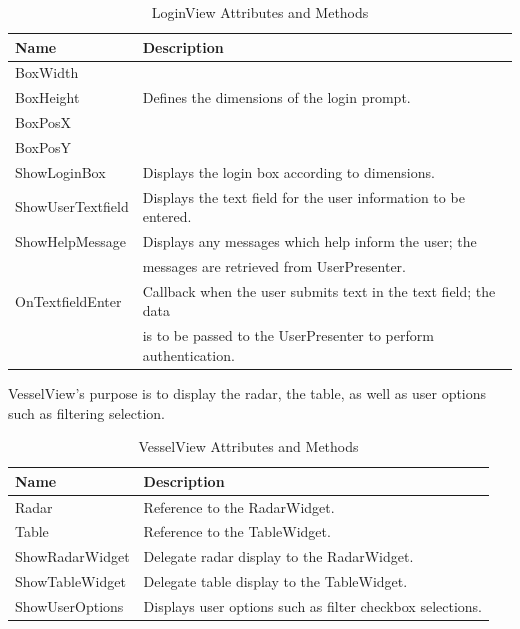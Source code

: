 \documentclass[12pt]{article}
\begin{document}
\begin{table}[ht]
\centering
   \begin{tabular}{|l|l|}
        \hline
        {\large Name} & {\large Description} \\
        \hline\hline
        BoxWidth &  \\
        BoxHeight &  Defines the dimensions of the login prompt.\\
        BoxPosX &  \\
        BoxPosY &  \\
        \hline
        ShowLoginBox & Displays the login box according to dimensions.\\
        \hline
        ShowUserTextfield & Displays the text field for the user information to be entered.\\
        \hline
        ShowHelpMessage & Displays any messages which help inform the user; the 
        \\ & messages are retrieved from UserPresenter.\\
        \hline
        OnTextfieldEnter & Callback when the user submits text in the text field; the data\\ & is to be passed to the UserPresenter to perform authentication.\\
        \hline
    \end{tabular}
\caption{LoginView Attributes and Methods}
\end{table}

\vspace*{0.2in}
\vspace*{0.15in}
VesselView’s purpose is to display the radar, the table, as well as user options such as filtering selection.
\begin{table}[ht]
\centering
   \begin{tabular}{|l|l|}
        \hline
        {\large Name} & {\large Description} \\
        \hline\hline
        Radar & Reference to the RadarWidget.\\
        \hline
        Table & Reference to the TableWidget.\\
        \hline
        ShowRadarWidget & Delegate radar display to the RadarWidget.\\
        \hline
        ShowTableWidget & Delegate table display to the TableWidget.\\
        \hline
        ShowUserOptions & Displays user options such as filter checkbox selections.\\
        \hline
    \end{tabular}
\caption{VesselView Attributes and Methods}
\end{table}
\end{document}
